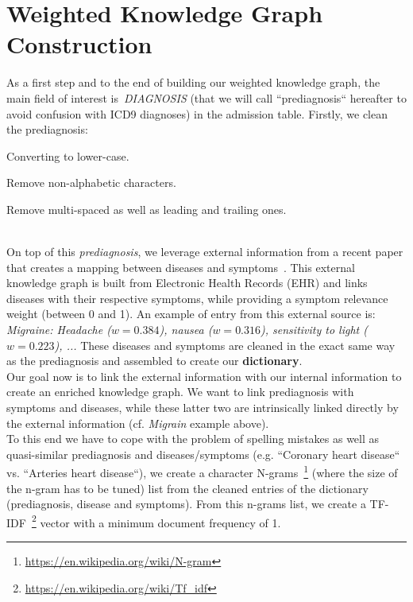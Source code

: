 \section{Weighted Knowledge Graph Construction}
As a first step and to the end of building our weighted knowledge graph, the main field of interest is~\emph{DIAGNOSIS} (that we will call ``prediagnosis`` hereafter to avoid confusion with ICD9 diagnoses) in the admission table. Firstly, we clean the prediagnosis: \begin{enumerate*}\item Converting to lower-case. \item Remove non-alphabetic characters. \item Remove multi-spaced as well as leading and trailing ones.\end{enumerate*} \\

On top of this \textit{prediagnosis}, we leverage external information from a recent paper that creates a mapping between diseases and symptoms~\cite{Rotmensch2017}. This external knowledge graph is built from Electronic Health Records (EHR) and links diseases with their respective symptoms, while providing a symptom relevance weight (between 0 and 1). An example of entry from this external source is: \emph{Migraine: Headache ($w=0.384$), nausea ($w=0.316$), sensitivity to light ($w=0.223$), ...} These diseases and symptoms are cleaned in the exact same way as the prediagnosis and assembled to create our \textbf{dictionary}. \\ 

Our goal now is to link the external information with our internal information to create an enriched knowledge graph. We want to link prediagnosis with symptoms and diseases, while these latter two are intrinsically linked directly by the external information (cf. \textit{Migrain} example above). \\

To this end we have to cope with the problem of spelling mistakes as well as quasi-similar prediagnosis and diseases/symptoms (e.g. ``Coronary heart disease`` vs. ``Arteries heart disease``), we create a character N-grams~\footnote{\url{https://en.wikipedia.org/wiki/N-gram}} (where the size of the n-gram has to be tuned) list from the cleaned entries of the dictionary (prediagnosis, disease and symptoms). From this n-grams list, we create a TF-IDF~\footnote{\href{https://en.wikipedia.org/wiki/Tf\%E2\%80\%93idf}{https://en.wikipedia.org/wiki/Tf\_idf}} vector with a minimum document frequency of 1. \\

